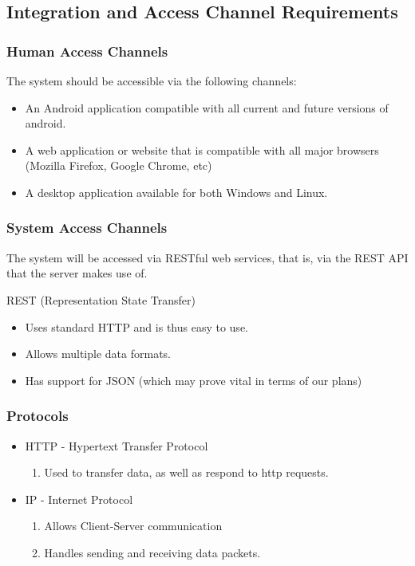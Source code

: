 \documentclass[hidelinks,a4paper,12pt]{article}
\begin{document}
	\subsection{Integration and Access Channel Requirements}
	\subsubsection{Human Access Channels}
	The system should be accessible via the following channels:
	\begin{itemize}
		\item An Android application compatible with all current and future versions of android.
		\item A web application or website that is compatible with all major browsers (Mozilla Firefox, Google Chrome, etc)
		\item A desktop application available for both Windows and Linux.
	\end{itemize}
	
	\subsubsection{System Access Channels}
	The system will be accessed via RESTful web services, that is, via the REST API that the server makes use of.
	
	REST (Representation State Transfer)
	\begin{itemize}
		\item Uses standard HTTP and is thus easy to use.
		\item Allows multiple data formats.
		\item Has support for JSON (which may prove vital in terms of our plans)
	\end{itemize}
	
	\subsubsection{Protocols}
	\begin{itemize}
		\item HTTP - Hypertext Transfer Protocol
		\begin{enumerate}
			\item Used to transfer data, as well as respond to http requests.
		\end{enumerate}
		\item IP - Internet Protocol
		\begin{enumerate}
			\item Allows Client-Server communication
			\item Handles sending and receiving data packets.
		\end{enumerate}
	\end{itemize}
	
\end{document}
